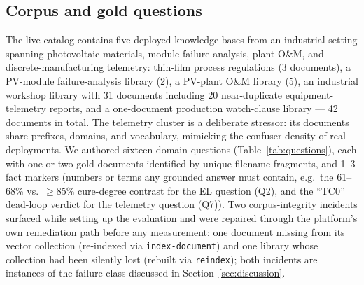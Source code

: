 \documentclass[preprint,12pt]{elsarticle}
\begin{document}
\subsection{Corpus and gold questions}
The live catalog contains five deployed knowledge bases from an industrial
setting spanning photovoltaic materials, module failure analysis, plant
O\&M, and discrete-manufacturing telemetry: thin-film process regulations
(3 documents), a
PV-module failure-analysis library (2), a PV-plant O\&M library (5), an
industrial workshop library with 31 documents including 20 near-duplicate
equipment-telemetry reports, and a one-document production watch-clause
library --- 42 documents in total. The telemetry cluster is a deliberate
stressor: its documents share prefixes, domains, and vocabulary, mimicking
the confuser density of real deployments. We authored sixteen domain
questions (Table~\ref{tab:questions}), each with one or two gold documents
identified by unique filename fragments, and 1--3 fact markers (numbers or
terms any grounded answer must contain, e.g.\ the 61--68\% vs.\ $\geq$85\%
cure-degree contrast for the EL question (Q2), and the ``TC0'' dead-loop
verdict for the telemetry question (Q7)).
Two corpus-integrity incidents surfaced while setting up the evaluation and
were repaired through the platform's own remediation path before any
measurement: one document missing from its vector collection (re-indexed
via \texttt{index-document}) and one library whose collection had been
silently lost (rebuilt via \texttt{reindex}); both incidents are instances
of the failure class discussed in Section~\ref{sec:discussion}.
\end{document}
